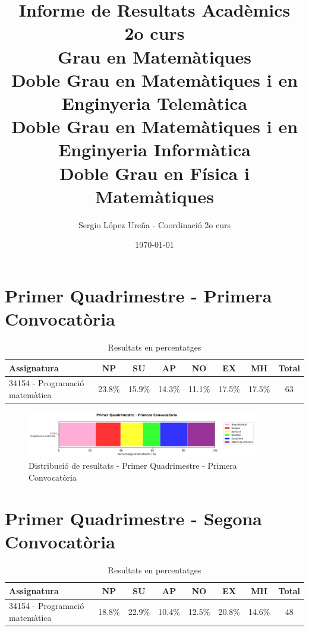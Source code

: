 \documentclass[12pt,a4paper]{article}
\title{Informe de Resultats Acadèmics \\ 2o curs \\
\small Grau en Matemàtiques \\
\small Doble Grau en Matemàtiques i en Enginyeria Telemàtica \\
\small Doble Grau en Matemàtiques i en Enginyeria Informàtica \\
\small Doble Grau en Física i Matemàtiques}
\author{Sergio López Ureña - Coordinació 2o curs}
\date{\today}
\begin{document}
\maketitle


\section{Primer Quadrimestre - Primera Convocatòria}

\begin{table}[H]
\centering
\small
\begin{tabular}{|p{4cm}|c|c|c|c|c|c|c|}
\hline
\textbf{Assignatura} & \textbf{NP} & \textbf{SU} & \textbf{AP} & \textbf{NO} & \textbf{EX} & \textbf{MH} & \textbf{Total} \\
\hline
34154 - Programació matemàtica & 23.8\% & 15.9\% & 14.3\% & 11.1\% & 17.5\% & 17.5\% & 63 \\
\hline
\end{tabular}
\caption{Resultats en percentatges}
\end{table}


\begin{figure}[H]
\centering
\includegraphics[width=0.9\textwidth]{graficos/barras_1Q1.png}
\caption{Distribució de resultats - Primer Quadrimestre - Primera Convocatòria}
\end{figure}

\clearpage


\section{Primer Quadrimestre - Segona Convocatòria}

\begin{table}[H]
\centering
\small
\begin{tabular}{|p{4cm}|c|c|c|c|c|c|c|}
\hline
\textbf{Assignatura} & \textbf{NP} & \textbf{SU} & \textbf{AP} & \textbf{NO} & \textbf{EX} & \textbf{MH} & \textbf{Total} \\
\hline
34154 - Programació matemàtica & 18.8\% & 22.9\% & 10.4\% & 12.5\% & 20.8\% & 14.6\% & 48 \\
\hline
\end{tabular}
\caption{Resultats en percentatges}
\end{table}
\end{document}
